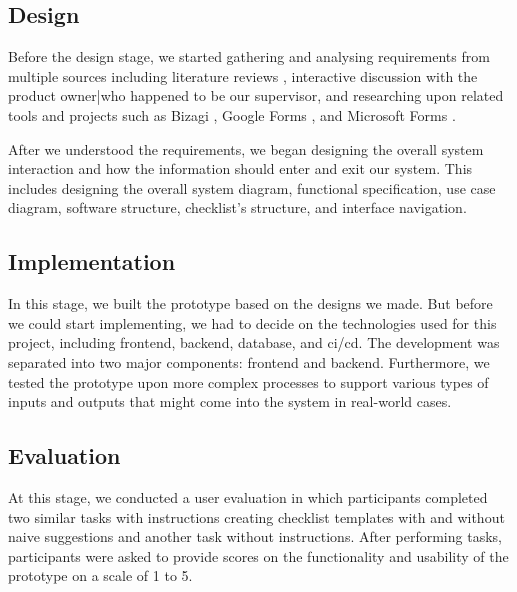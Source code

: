 \subsection{Design}
Before the design stage, we started gathering and analysing requirements from multiple sources including literature reviews \cite{checklistdesign, papapanagiotou2017workflowfm}, interactive discussion with the product owner|who happened to be our supervisor, and researching upon related tools and projects such as Bizagi \cite{bizagi}, Google Forms \cite{googleforms}, and Microsoft Forms \cite{msforms}.

After we understood the requirements, we began designing the overall system interaction and how the information should enter and exit our system. This includes designing the overall system diagram, functional specification, use case diagram, software structure, checklist's structure, and interface navigation.


\subsection{Implementation}
In this stage, we built the prototype based on the designs we made. But before we could start implementing, we had to decide on the technologies used for this project, including frontend, backend, database, and ci/cd. The development was separated into two major components: frontend and backend. Furthermore, we tested the prototype upon more complex processes to support various types of inputs and outputs that might come into the system in real-world cases.



\subsection{Evaluation}
At this stage, we conducted a user evaluation in which participants completed two similar tasks with instructions creating checklist templates with and without naive suggestions and another task without instructions. After performing tasks, participants were asked to provide scores on the functionality and usability of the prototype on a scale of 1 to 5.

